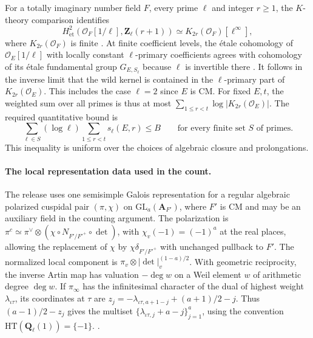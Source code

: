 For a totally imaginary number field \(F\), every prime \(\ell\) and
integer \(r\ge1\), the \(K\)-theory comparison identifies
\[
 H^2_{\mathrm{\acute et}}(\mathcal O_F[1/\ell],\mathbf Z_\ell(r+1))
 \simeq K_{2r}(\mathcal O_F)[\ell^\infty],
\]
where \(K_{2r}(\mathcal O_F)\) is finite
\cite[Theorems~VI.8.2 and~VI.8.4]{f1weibel-kbook}. At finite coefficient
levels, the \'etale cohomology of \(\mathcal O_E[1/\ell]\) with locally
constant \(\ell\)-primary coefficients agrees with cohomology of its
\'etale fundamental group \(G_{E,S_\ell}\) because \(\ell\) is
invertible there \cite[Proposition~II.2.9]{f1milne-adt}. It follows in
the inverse limit that the wild kernel is contained in the
\(\ell\)-primary part of \(K_{2r}(\mathcal O_E)\). This includes the
case \(\ell=2\) since \(E\) is CM.
For fixed \(E,t\), the weighted sum over all primes is thus at most
\(\sum_{1\le r<t}\log|K_{2r}(\mathcal O_E)|\).
The required quantitative bound is
\begin{equation}
\label{eq:family-selmer}
  \sum_{\ell\in S}(\log\ell)\sum_{1\le r<t}s_\ell(E,r)\le B
  \qquad\text{for every finite set \(S\) of primes.}
\end{equation}
This inequality is uniform over the choices of algebraic closure
and prolongations.

\paragraph{The local representation data used in the count.}
%
The release uses one semisimple Galois representation for a regular
algebraic polarized cuspidal pair \((\pi,\chi)\) on
\(\mathrm{GL}_a(\mathbf A_{F'})\), where \(F'\) is CM and may be an
auxiliary field in the counting argument. The polarization is
\(\pi^c\simeq\pi^\vee\otimes(\chi\circ N_{F'/F'^{+}}\circ\det)\), with
\(\chi_v(-1)=(-1)^a\) at the real places, allowing the replacement of
\(\chi\) by \(\chi\delta_{F'/F'^{+}}\) with unchanged pullback to \(F'\).
The normalized local component is
\(\pi_v\otimes|\det|_v^{(1-a)/2}\). With geometric reciprocity,
the inverse Artin map has valuation \(-\deg w\) on a Weil element \(w\)
of arithmetic degree \(\deg w\).
If \(\pi_\infty\) has the infinitesimal character of the dual of
highest weight \(\lambda_{\iota\tau}\), its coordinates at \(\tau\)
are \(z_j=-\lambda_{\iota\tau,a+1-j}+(a+1)/2-j\). Thus
\((a-1)/2-z_j\) gives the multiset
\(\{\lambda_{\iota\tau,j}+a-j\}_{j=1}^a\), using the convention
\(\mathrm{HT}(\mathbf Q_\ell(1))=\{-1\}\).
.

